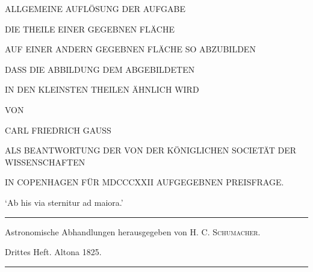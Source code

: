 \clearpage
{}
\thispagestyle{empty}
\vspace*{.35in}
\begin{center}
{\large ALLGEMEINE AUFLÖSUNG DER AUFGABE}\par\bigskip
{\Large DIE THEILE EINER GEGEBNEN FLÄCHE}\par\bigskip
AUF EINER ANDERN GEGEBNEN FLÄCHE SO ABZUBILDEN\par\bigskip
DASS DIE ABBILDUNG DEM ABGEBILDETEN\par\bigskip
IN DEN KLEINSTEN THEILEN ÄHNLICH WIRD\par\vspace{28pt}
VON\par\vspace{28pt}
{\large CARL FRIEDRICH GAUSS}\par\vspace{30pt}
{\small ALS BEANTWORTUNG DER VON DER KÖNIGLICHEN SOCIETÄT DER WISSENSCHAFTEN\par
IN COPENHAGEN FÜR MDCCCXXII AUFGEGEBNEN PREISFRAGE.}\par\bigskip
\end{center}
\begin{flushright}‘Ab his via sternitur ad maiora.’\end{flushright}
\vfill
\begin{center}
\rule{.8\linewidth}{.3pt}\par\smallskip
Astronomische Abhandlungen herausgegeben von H. C. \textsc{Schumacher}.\par
Drittes Heft. Altona 1825.\par\smallskip
\rule{.8\linewidth}{.3pt}
\end{center}
\clearpage
